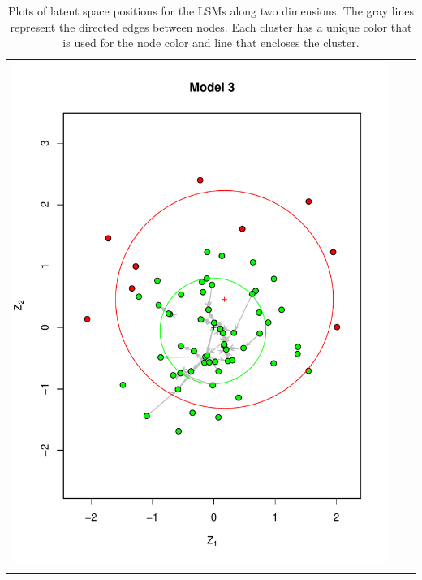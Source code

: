 \documentclass[fleqn,12pt]{wlscirep}
\begin{document}
\begin{longtable}[!h]{ccc}
\includegraphics[height=.3\textheight, clip=true, trim=2.05cm 2.55cm 1cm 2cm]{figures/LSM_m3.pdf} \\
\caption{\label{fig:LSM_plot_1} Plots of latent space positions for the LSMs along two dimensions. The gray lines represent the directed edges between nodes. Each cluster has a unique color that is used for the node color and line that encloses the cluster.}
\end{longtable}
\end{document}
